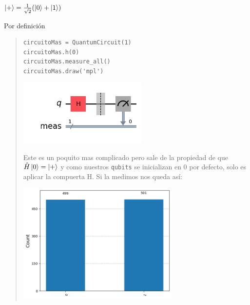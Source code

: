 \textbf{$\ket{+} = \frac{1}{\sqrt{2}}(\ket{0}+\ket{1})$}\vspace{.2cm}

\textcolor{bibi}{Por definición}\vspace{.2cm}
\begin{quote}
    \begin{verbatim}
circuitoMas = QuantumCircuit(1)
circuitoMas.h(0)
circuitoMas.measure_all()
circuitoMas.draw('mpl')
    \end{verbatim}
    \vspace{.3cm}
    \begin{center}
        \includegraphics[height=3.3cm]{src/Img/1.2.png}
    \end{center}

    Este es un poquito mas complicado pero sale de la propiedad de que
    $\hat{H}\ket{0}=\ket{+}$ y como nuestros \texttt{qubits} se inicializan en 0 por
    defecto, solo es aplicar la compuerta H. Si la medimos nos queda así:
    \vspace{.5cm}

    \begin{center}
        \includegraphics[height=6cm]{src/Img/1.2.r.png}
    \end{center}
\end{quote}
\vspace{.4cm}
